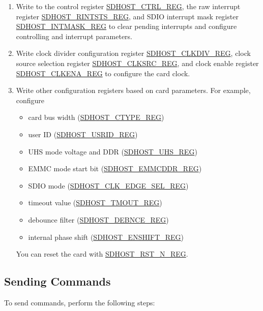 \documentclass[main\_\_EN.tex]{subfiles}
\begin{document}
\begin{enumerate}
\item Write to the control register \hyperref[regdesc:SDHOSTCTRLREG]{SDHOST\_CTRL\_REG}, the raw interrupt register \hyperref[regdesc:SDHOSTRINTSTSREG]{SDHOST\_RINTSTS\_REG}, and SDIO interrupt mask register \hyperref[regdesc:SDHOSTINTMASKREG]{SDHOST\_INTMASK\_REG} to clear pending interrupts and configure controlling and interrupt parameters.
\item Write clock divider configuration register \hyperref[regdesc:SDHOSTCLKDIVREG]{SDHOST\_CLKDIV\_REG}, clock source selection register \hyperref[fielddesc:SDHOSTCLKSRCREG]{\hyperref[regdesc:SDHOSTCLKSRCREG]{SDHOST\_CLKSRC\_REG}}, and clock enable register \hyperref[regdesc:SDHOSTCLKENAREG]{SDHOST\_CLKENA\_REG} to configure the card clock.
\item Write other configuration registers based on card parameters. For example, configure 
    \begin{itemize}
        \item card bus width (\hyperref[regdesc:SDHOSTCTYPEREG]{SDHOST\_CTYPE\_REG})
        \item user ID (\hyperref[fielddesc:SDHOSTUSRIDREG]{\hyperref[regdesc:SDHOSTUSRIDREG]{SDHOST\_USRID\_REG}})
        \item
        UHS mode voltage and DDR (\hyperref[regdesc:SDHOSTUHSREG]{SDHOST\_UHS\_REG})
        \item
        EMMC mode start bit (\hyperref[regdesc:SDHOSTEMMCDDRREG]{SDHOST\_EMMCDDR\_REG})
        \item SDIO mode (\hyperref[regdesc:SDHOSTCLKEDGESELREG]{SDHOST\_CLK\_EDGE\_SEL\_REG})
        \item timeout value (\hyperref[regdesc:SDHOSTTMOUTREG]{SDHOST\_TMOUT\_REG})
        \item debounce filter (\hyperref[regdesc:SDHOSTDEBNCEREG]{SDHOST\_DEBNCE\_REG})
        \item internal phase shift (\hyperref[regdesc:SDHOSTENSHIFTREG]{SDHOST\_ENSHIFT\_REG})
    \end{itemize}
     You can reset the card with \hyperref[regdesc:SDHOSTRSTNREG]{SDHOST\_RST\_N\_REG}.
\end{enumerate}

\subsection{Sending Commands}

To send commands, perform the following steps:
\end{document}
